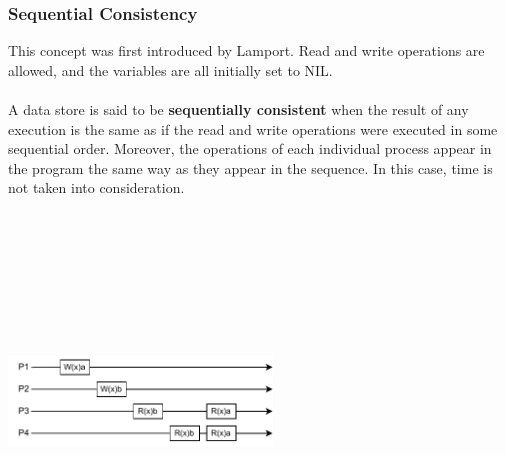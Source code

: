 \documentclass{article}
\begin{document}
\subsubsection{Sequential Consistency}
This concept was first introduced by Lamport. Read and write operations are allowed, and the variables are all initially set to NIL. \\ \\
A data store is said to be \textbf{sequentially consistent} when the result of any execution is the same as if the read and write operations were executed in some sequential order. Moreover, the operations of each individual process appear in the program the same way as they appear in the sequence. In this case, time is not taken into consideration.
\begin{center}
	\includegraphics[width=7cm, height=10cm, keepaspectratio]{assets/sequential-consistency.pdf}
\end{center}
\end{document}
